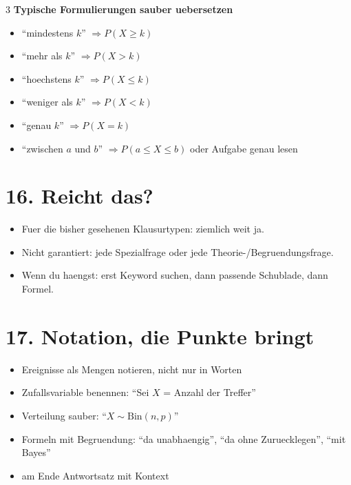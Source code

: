 \documentclass[a4paper,8pt,landscape]{article}
\newcommand{\Bin}{\mathrm{Bin}}
\begin{document}
\begin{multicols*}{3}
\textbf{Typische Formulierungen sauber uebersetzen}
\begin{itemize}
  \item ``mindestens $k$'' $\Rightarrow P(X\ge k)$
  \item ``mehr als $k$'' $\Rightarrow P(X>k)$
  \item ``hoechstens $k$'' $\Rightarrow P(X\le k)$
  \item ``weniger als $k$'' $\Rightarrow P(X<k)$
  \item ``genau $k$'' $\Rightarrow P(X=k)$
  \item ``zwischen $a$ und $b$'' $\Rightarrow P(a\le X\le b)$ oder Aufgabe genau lesen
\end{itemize}

\section*{16. Reicht das?}
\begin{itemize}
  \item Fuer die bisher gesehenen Klausurtypen: ziemlich weit ja.
  \item Nicht garantiert: jede Spezialfrage oder jede Theorie-/Begruendungsfrage.
  \item Wenn du haengst: erst Keyword suchen, dann passende Schublade, dann Formel.
\end{itemize}

\section*{17. Notation, die Punkte bringt}
\begin{itemize}
  \item Ereignisse als Mengen notieren, nicht nur in Worten
  \item Zufallsvariable benennen: ``Sei $X$ = Anzahl der Treffer''
  \item Verteilung sauber: ``$X\sim\Bin(n,p)$''
  \item Formeln mit Begruendung: ``da unabhaengig'', ``da ohne Zuruecklegen'', ``mit Bayes''
  \item am Ende Antwortsatz mit Kontext
\end{itemize}


\end{multicols*}
\end{document}
